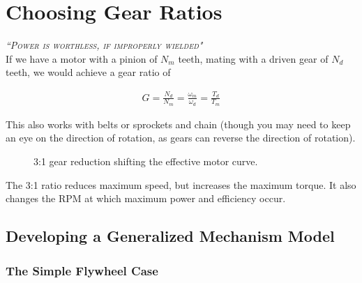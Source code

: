 \documentclass[10pt,letterpaper]{book}
\begin{document}



\chapter{Choosing Gear Ratios}

 {\slshape \scshape ``Power is worthless, if improperly wielded"}
 \\

If we have a motor with a pinion of $N_m$ teeth, mating with a driven gear of $N_d$ teeth, we would achieve a gear ratio of

\begin{align}
  G = \frac{N_d}{N_m} = \frac{\omega_m}{\omega_d} = \frac{T_d}{T_m}
\end{align}

This also works with belts or sprockets and chain (though you may need to keep an eye on the direction of rotation, as gears can reverse the direction of rotation).


\begin{figure}[H] \centering
{}
\caption{3:1 gear reduction shifting the effective motor curve.}
\end{figure}

The 3:1 ratio reduces maximum speed, but increases the maximum torque.
It also changes the RPM at which maximum power and efficiency occur.

\section{Developing a Generalized Mechanism Model}

\subsection{The Simple Flywheel Case}
\end{document}
